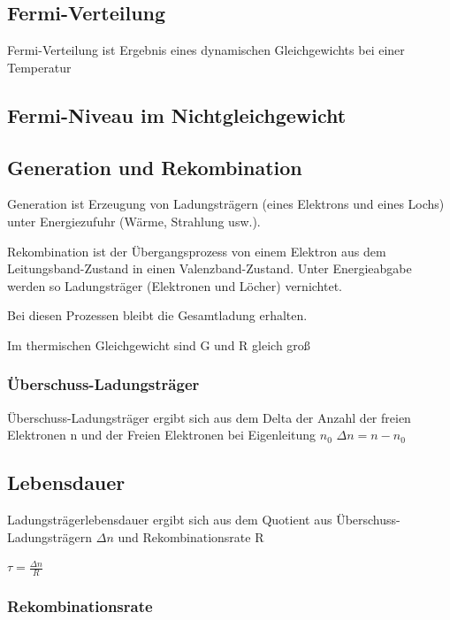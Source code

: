 \subsection{Fermi-Verteilung}
Fermi-Verteilung ist Ergebnis eines dynamischen Gleichgewichts bei einer Temperatur
\subsection{Fermi-Niveau im Nichtgleichgewicht}
	
	\subsection{Generation und Rekombination}
		Generation ist Erzeugung von Ladungsträgern (eines Elektrons und eines Lochs) unter Energiezufuhr (Wärme, Strahlung usw.).
		\newline
		
		Rekombination ist der Übergangsprozess von einem Elektron aus dem Leitungsband-Zustand in einen Valenzband-Zustand. Unter Energieabgabe werden so Ladungsträger
		(Elektronen und Löcher) vernichtet.
		\newline
		
		Bei diesen Prozessen bleibt die Gesamtladung erhalten.
		\newline
		
		Im thermischen Gleichgewicht sind G und R gleich groß
		\newline
		
	\subsubsection{Überschuss-Ladungsträger}
	
	Überschuss-Ladungsträger ergibt sich aus dem Delta der Anzahl der freien Elektronen n und der Freien Elektronen bei Eigenleitung $n_0$
	\newline
	$\Delta n=n - n_0$
	
	\subsection{Lebensdauer}
	Ladungsträgerlebensdauer ergibt sich aus dem Quotient aus Überschuss-Ladungsträgern $\Delta n$ und Rekombinationsrate R
	\newline
	
	$\tau =\frac{\Delta n}{R}$
	
	
	\subsubsection{Rekombinationsrate}

